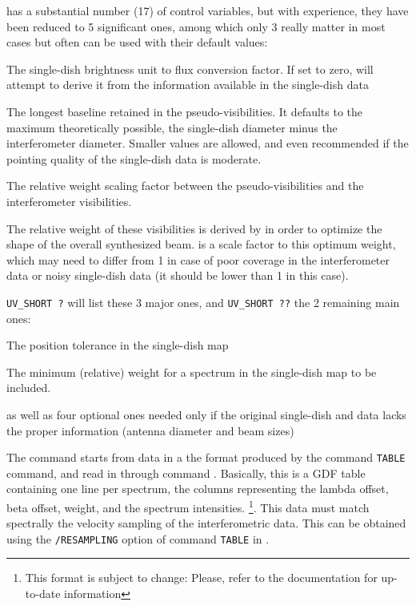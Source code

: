  has a substantial number (17)
of control variables, but with experience, they have been reduced
to 5 significant ones, among which only 3 really matter in most cases
but often can be used with their default values:
\begin{description}\itemsep 0pt
\item{} The single-dish brightness unit to 
flux conversion factor. If set to zero,  will attempt
to derive it from the information available in the single-dish data   
\item{} The longest baseline retained in
the pseudo-visibilities. It defaults to the maximum theoretically possible,
the single-dish diameter minus the interferometer diameter. Smaller
values are allowed, and even recommended if the pointing quality
of the single-dish data is moderate.
\item{} The relative weight scaling factor
between the pseudo-visibilities and the interferometer visibilities.
\end{description}
The relative weight of these visibilities is derived by 
in order to optimize the shape of the overall synthesized beam. 
 is a scale factor to this optimum weight,
which may need to differ from 1 in case of poor \uv{} coverage in
the interferometer data or 
noisy single-dish data (it should be lower than 1 in this case).


\texttt{UV\_SHORT ?} will list these 3 major ones, and \texttt{UV\_SHORT ??} the
2 remaining main ones:
\begin{description}\itemsep 0pt
\item{} The position tolerance in the single-dish map
\item{}  The minimum (relative) weight for a spectrum
in the single-dish map to be included.    
\end{description}
as well as four optional ones needed only if the original single-dish
and \uv{} data lacks the proper information (antenna diameter and beam sizes)

The  command starts from data in a the format produced by the \class{} command
\texttt{TABLE}
command, and read in \imager{} through command . 
Basically, this is a GDF table containing one line per spectrum,
the columns representing the lambda offset, beta offset, weight, and the
spectrum intensities. \footnote{This format is subject to change: Please, refer to
the  documentation for up-to-date information}. This data
must match spectrally the velocity sampling of the interferometric
data. This can be obtained using the \texttt{/RESAMPLING} option of
command \texttt{TABLE} in \class{}.

